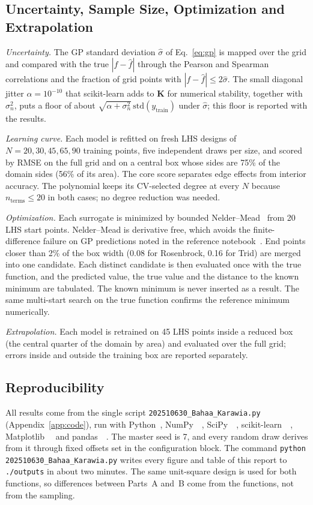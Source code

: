 \subsection{Uncertainty, Sample Size, Optimization and Extrapolation}\label{sec:protocols}

\emph{Uncertainty.} The GP standard deviation $\hat\sigma$ of Eq.~\eqref{eq:gp} is mapped over the grid and compared with the true $|f-\hat f|$ through the Pearson and Spearman correlations and the fraction of grid points with $|f-\hat f|\le2\hat\sigma$. The small diagonal jitter $\alpha=10^{-10}$ that scikit-learn adds to $\mathbf{K}$ for numerical stability, together with $\sigma_n^2$, puts a floor of about $\sqrt{\alpha+\sigma_n^2}\,\mathrm{std}(y_{\mathrm{train}})$ under $\hat\sigma$; this floor is reported with the results.

\emph{Learning curve.} Each model is refitted on fresh LHS designs of $N=20,30,45,65,90$ training points, five independent draws per size, and scored by RMSE on the full grid and on a central box whose sides are 75\% of the domain sides (56\% of its area). The core score separates edge effects from interior accuracy. The polynomial keeps its CV-selected degree at every $N$ because $n_{\mathrm{terms}}\le20$ in both cases; no degree reduction was needed.

\emph{Optimization.} Each surrogate is minimized by bounded Nelder--Mead~\cite{nelder1965} from 20 LHS start points. Nelder--Mead is derivative free, which avoids the finite-difference failure on GP predictions noted in the reference notebook~\cite{ae541tutorial}. End points closer than 2\% of the box width (0.08 for Rosenbrock, 0.16 for Trid) are merged into one candidate. Each distinct candidate is then evaluated once with the true function, and the predicted value, the true value and the distance to the known minimum are tabulated. The known minimum is never inserted as a result. The same multi-start search on the true function confirms the reference minimum numerically.

\emph{Extrapolation.} Each model is retrained on 45 LHS points inside a reduced box (the central quarter of the domain by area) and evaluated over the full grid; errors inside and outside the training box are reported separately.

\subsection{Reproducibility}

All results come from the single script \texttt{202510630\_Bahaa\_Karawia.py} (Appendix~\ref{app:code}), run with Python~\pyver, NumPy~\npver~\cite{harris2020}, SciPy~\spver~\cite{virtanen2020}, scikit-learn~\skver~\cite{pedregosa2011}, Matplotlib~\mplver~\cite{hunter2007} and pandas~\pdver~\cite{mckinney2010}. The master seed is 7, and every random draw derives from it through fixed offsets set in the configuration block. The command \texttt{python 202510630\_Bahaa\_Karawia.py} writes every figure and table of this report to \texttt{./outputs} in about two minutes. The same unit-square design is used for both functions, so differences between Parts~A and~B come from the functions, not from the sampling.

